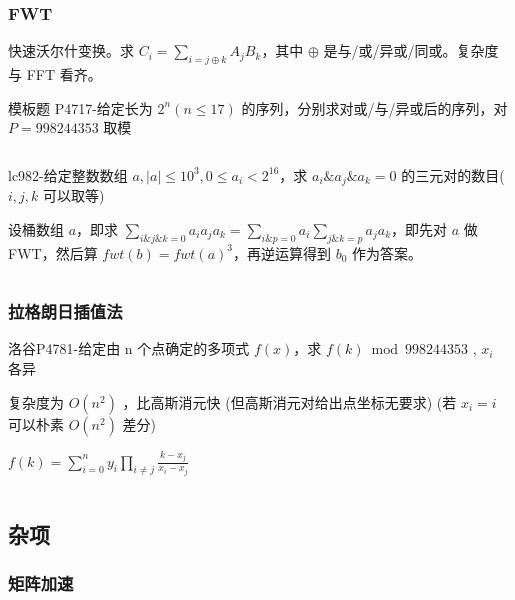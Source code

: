 \documentclass[twocolumn,10pt]{ctexart}
\begin{document}
\inputminted{cpp}{code/ext_016.cpp}

\subsubsection{FWT}

快速沃尔什变换。求 $C_i=\sum_{i=j\oplus k}A_jB_k$，其中 $\oplus$ 是与/或/异或/同或。复杂度与 FFT 看齐。

\begin{notebox}
模板题 P4717-给定长为 $2^n(n\le 17)$ 的序列，分别求对或/与/异或后的序列，对 $P=998244353$ 取模
\end{notebox}

\inputminted{cpp}{code/p4717_fwt.cpp}

\begin{notebox}
lc982-给定整数数组 $a,|a|\le10^3,0\le a_i<2^{16}$，求 $a_i\&a_j\&a_k=0$ 的三元对的数目($i,j,k$ 可以取等)
\end{notebox}

设桶数组 $a$，即求 $\sum_{i\&j\&k=0}a_ia_ja_k=\sum_{i\&p=0}a_i\sum_{j\&k=p}a_ja_k$，即先对 $a$ 做 FWT，然后算 $fwt(b)=fwt(a)^3$，再逆运算得到 $b_0$ 作为答案。

\inputminted{cpp}{code/fwt.cpp}

\subsubsection{拉格朗日插值法}

\begin{notebox}
洛谷P4781-给定由 n 个点确定的多项式 $f(x)$，求 $f(k)\bmod998244353$ , $x_i$ 各异
\end{notebox}

复杂度为 $O(n^2)$ ，比高斯消元快 (但高斯消元对给出点坐标无要求) (若 $x_i=i$ 可以朴素 $O(n^2)$ 差分)

\begin{adjustbox}{max width=\linewidth,center}
$f(k)=\sum_{i=0}^ny_i\prod_{i\neq j}\frac{k-x_j}{x_i-x_j}$
\end{adjustbox}

\inputminted{cpp}{code/p4781_lagrange.cpp}

\subsection{杂项}

\subsubsection{矩阵加速}
\end{document}
